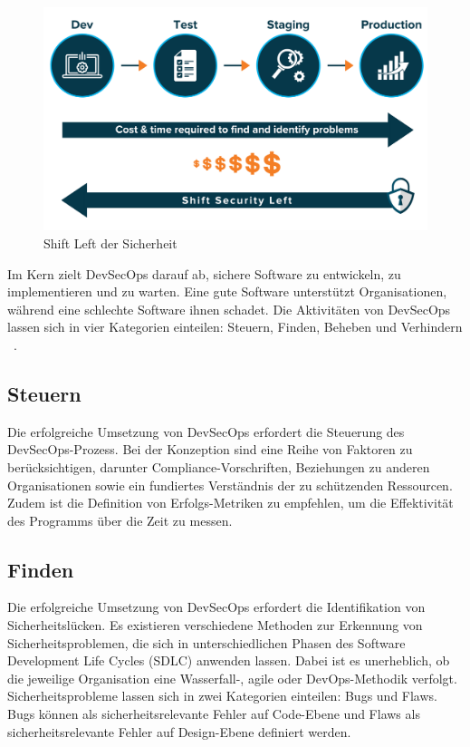 \begin{figure}[h!]
  \includegraphics[width=\linewidth]{img/ShiftLeft.png}
  \caption{Shift Left der Sicherheit ~\cite{Haug2020}}
  \label{fig:shiftleft}
\end{figure}

Im Kern zielt DevSecOps darauf ab, sichere Software zu entwickeln, zu implementieren und zu warten. Eine gute Software unterstützt Organisationen, während eine schlechte Software ihnen schadet. Die Aktivitäten von DevSecOps lassen sich in vier Kategorien einteilen: Steuern, Finden, Beheben und Verhindern ~\cite{Haug2020}.

\subsection{Steuern}
Die erfolgreiche Umsetzung von DevSecOps erfordert die Steuerung des DevSecOps-Prozess. Bei der Konzeption sind eine Reihe von Faktoren zu berücksichtigen, darunter Compliance-Vorschriften, Beziehungen zu anderen Organisationen sowie ein fundiertes Verständnis der zu schützenden Ressourcen. Zudem ist die Definition von Erfolgs-Metriken zu empfehlen, um die Effektivität des Programms über die Zeit zu messen.

\subsection{Finden}
Die erfolgreiche Umsetzung von DevSecOps erfordert die Identifikation von Sicherheitslücken. Es existieren verschiedene Methoden zur Erkennung von Sicherheitsproblemen, die sich in unterschiedlichen Phasen des Software Development Life Cycles (SDLC) anwenden lassen. Dabei ist es unerheblich, ob die jeweilige Organisation eine Wasserfall-, agile oder DevOps-Methodik verfolgt. Sicherheitsprobleme lassen sich in zwei Kategorien einteilen: Bugs und Flaws. Bugs können als sicherheitsrelevante Fehler auf Code-Ebene und Flaws als sicherheitsrelevante Fehler auf Design-Ebene definiert werden.

